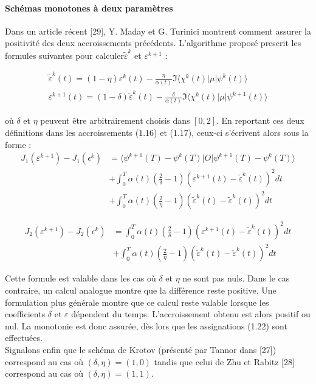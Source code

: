 \paragraph*{Schémas monotones à deux paramètres}
$ $\\Dans un article récent [29], Y. Maday et G. Turinici montrent comment assurer la positivité des deux accroissements précédents. L’algorithme proposé prescrit les formules suivantes pour calculer$\tilde{\varepsilon}^k$ et $\varepsilon^{k+1}$ :

\begin{equation}
\begin{split}
\tilde{\varepsilon}^k(t) = (1-\eta)\varepsilon^k(t)-\frac{\eta}{\alpha(t)} \Im\langle \chi^k(t)|\mu|\psi^k(t)\rangle\quad \\
\varepsilon^{k+1}(t) = (1-\delta)\tilde{\varepsilon}^k(t) -\frac{\delta}{\alpha(t)} \Im\langle \chi^k(t)|\mu|\psi^{k+1}(t)\rangle
\end{split}
\end{equation}

où $\delta$ et $\eta$ peuvent être arbitrairement choisis dans $[0, 2]$. En reportant ces deux définitions dans les accroissements (1.16) et (1.17), ceux-ci s’écrivent alors sous la forme :
\begin{align*}
J_1(\varepsilon^{k+1})-J_1(\epsilon^k) &= \langle \psi^{k+1}(T) - \psi^k(T)|O|\psi^{k+1}(T) - \psi^k(T)\rangle\\
\quad & + \int_0^T \alpha(t)(\frac{2}{\delta} - 1)(\varepsilon^{k+1}(t) - \tilde{\varepsilon}^k(t))^2dt\\
 \quad & + \int_0^T \alpha(t)(\frac{2}{\eta} - 1)(\tilde{\varepsilon}^k(t) - \tilde{\varepsilon}^k(t))^2dt
\end{align*}

\begin{align*}
J_2(\varepsilon^{k+1})-J_2(\epsilon^k) &=  \int_0^T \alpha(t)(\frac{2}{\delta} - 1)(\varepsilon^{k+1}(t) - \tilde{\varepsilon}^k(t))^2dt\\
 \quad & + \int_0^T \alpha(t)(\frac{2}{\eta} - 1)(\tilde{\varepsilon}^k(t) - \tilde{\varepsilon}^k(t))^2dt
\end{align*}

Cette formule est valable dans les cas où $\delta$ et $\eta$ ne sont pas nuls. Dans le cas contraire, un calcul analogue montre que la différence reste positive. Une formulation plus générale montre que ce calcul reste valable lorsque les coefficients $\delta$ et $\varepsilon$ dépendent du temps.
L'accroissement obtenu est alors positif ou nul. La monotonie est donc assurée, dès lors que les assignations (1.22) sont effectuées.
\\Signalons enfin que le schéma de Krotov (présenté par Tannor dans [27]) correspond au cas où $(\delta,\eta)= (1, 0)$ tandis que celui de Zhu et Rabitz [28] correspond au cas où $(\delta,\eta)= (1, 1)$.

